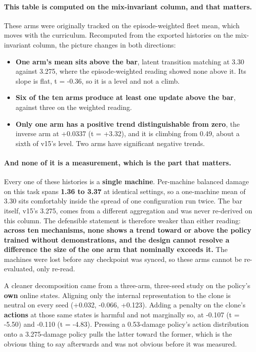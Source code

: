 \documentclass[11pt]{article}
\begin{document}
\paragraph{This table is computed on the mix-invariant column, and that matters.} These arms were originally tracked on the episode-weighted fleet mean, which moves with the curriculum. Recomputed from the exported histories on the mix-invariant column, the picture changes in both directions:

\begin{itemize}
\item \textbf{One arm's mean sits above the bar}, latent transition matching at 3.30 against 3.275, where the episode-weighted reading showed none above it. Its slope is flat, t = -0.36, so it is a level and not a climb.
\item \textbf{Six of the ten arms produce at least one update above the bar}, against three on the weighted reading.
\item \textbf{Only one arm has a positive trend distinguishable from zero}, the inverse arm at +0.0337 (t = +3.32), and it is climbing from 0.49, about a sixth of v15's level. Two arms have significant negative trends.
\end{itemize}

\paragraph{And none of it is a measurement, which is the part that matters.} Every one of these histories is a \textbf{single machine}. Per-machine balanced damage on this task spans \textbf{1.36 to 3.37} at identical settings, so a one-machine mean of 3.30 sits comfortably inside the spread of one configuration run twice. The bar itself, v15's 3.275, comes from a different aggregation and was never re-derived on this column. The defensible statement is therefore weaker than either reading: \textbf{across ten mechanisms, none shows a trend toward or above the policy trained without demonstrations, and the design cannot resolve a difference the size of the one arm that nominally exceeds it.} The machines were lost before any checkpoint was synced, so these arms cannot be re-evaluated, only re-read.

A cleaner decomposition came from a three-arm, three-seed study on the policy's \textbf{own} online states. Aligning only the internal representation to the clone is neutral on every seed (+0.032, -0.066, +0.123). Adding a penalty on the clone's \textbf{actions} at those same states is harmful and not marginally so, at -0.107 (t = -5.50) and -0.110 (t = -4.83). Pressing a 0.53-damage policy's action distribution onto a 3.275-damage policy pulls the latter toward the former, which is the obvious thing to say afterwards and was not obvious before it was measured.
\end{document}
